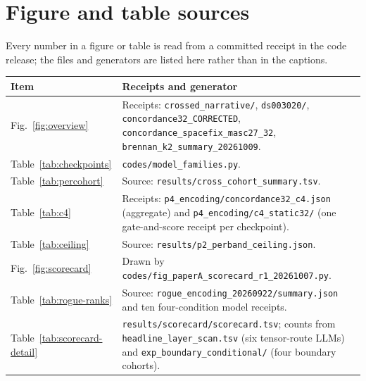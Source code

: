 \documentclass{article}
\begin{document}


\section{Figure and table sources}
\label{app:sources}
Every number in a figure or table is read from a committed receipt in the code release; the files and generators are listed here rather than in the captions.
{\small\begin{longtable}{@{}p{}>{\raggedright\arraybackslash}p{}@{}}
\toprule Item & Receipts and generator \\ \midrule
\endhead
Fig.~\ref{fig:overview} & Receipts: \texttt{crossed\_narrative/}, \texttt{ds003020/}, \texttt{concordance32\_CORRECTED}, \texttt{concordance\_spacefix\_masc27\_32}, \texttt{brennan\_k2\_summary\_20261009}. \\
Table~\ref{tab:checkpoints} & \texttt{codes/model\_families.py}. \\
Table~\ref{tab:percohort} & Source:
\texttt{results/cross\_cohort\_summary.tsv}. \\
Table~\ref{tab:c4} & Receipts:
\texttt{p4\_encoding/\allowbreak concordance32\_c4.json} (aggregate) and \texttt{p4\_encoding/\allowbreak c4\_static32/}
(one gate-and-score receipt per checkpoint). \\
Table~\ref{tab:ceiling} & Source: \texttt{results/p2\_perband\_ceiling.json}. \\
Fig.~\ref{fig:scorecard} & Drawn by \texttt{codes/fig\_paperA\_scorecard\_r1\_20261007.py}. \\
Table~\ref{tab:rogue-ranks} & Source: \texttt{rogue\_encoding\_20260922/summary.json} and ten four-condition model receipts. \\
Table~\ref{tab:scorecard-detail} & \texttt{results/scorecard/scorecard.tsv}; counts from \texttt{headline\_layer\_scan.tsv} (six tensor-route LLMs) and \texttt{exp\_boundary\_conditional/} (four boundary cohorts). \\
\bottomrule
\end{longtable}}
\end{document}
